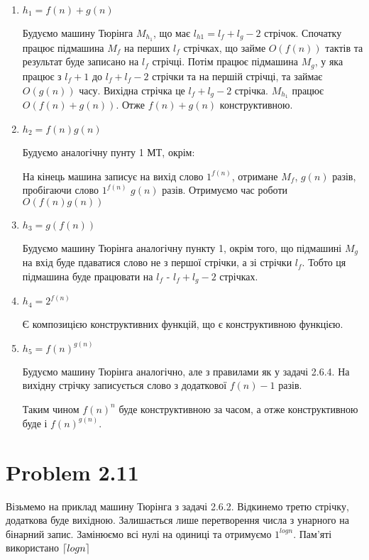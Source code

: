\documentclass[12pt,letterpaper]{article}
\DeclarePairedDelimiter{\ceil}{\lceil}{\rceil}
\begin{document}
\begin{enumerate}
    \item $h_1 = f(n) + g(n)$
        
        Будуємо машину Тюрінга $M_{h_1}$, що має $l_{h1} = l_f + l_g - 2$ стрічок.
        Спочатку працює підмашина $M_f$ на перших $l_f$ стрічках, що займе $O(f(n))$
        тактів та результат буде записано на $l_f$ стрічці. Потім працює підмашина
        $M_g$, у яка працює з $l_f + 1$ до $l_f + l_f - 2$ стрічки та на першій
        стрічці, та займає $O(g(n))$ часу. Вихідна стрічка це $l_f + l_g - 2$
        стрічка. $M_{h_1}$ працює $O(f(n) + g(n))$. Отже $f(n) + g(n)$  конструктивною.

    \item $h_2 = f(n) g(n)$

        Будуємо аналогічну пунту 1 МТ, окрім:

        На кінець машина записує на вихід слово $1^{f(n)}$, отримане $M_f$, $g(n)$
        разів, пробігаючи слово $1^{f(n)}$ $g(n)$ разів. Отримуємо час роботи $O(f(n)g(n))$

    \item $h_3 = g(f(n))$

        Будуємо машину Тюрінга аналогічну пункту 1, окрім того, що підмашині $M_g$ на
        вхід буде пдаватися слово не з першої стрічки, а зі стрічки $l_f$. Тобто ця
        підмашина буде працювати на $l_f$ - $l_f + l_g - 2$ стрічках.

    \item $h_4 = 2^{f(n)}$

        Є композицією конструктивних функцій, що є конструктивною функцією.

    \item $h_5 = f(n)^{g(n)}$

        Будуємо машину Тюрінга аналогічно, але з правилами як у задачі 2.6.4.
        На вихідну стрічку записується слово з додаткової $f(n) - 1$ разів.

        Таким чином $f(n)^n$ буде конструктивною за часом, а отже конструктивною буде і
        $f(n)^{g(n)}$.

        
\end{enumerate}


\section{Problem 2.11}

Візьмемо на приклад машину Тюрінга з задачі  2.6.2. Відкинемо третю стрічку, додаткова
буде вихідною. Залишається лише перетворення числа з унарного на бінарний запис.
Замінюємо всі нулі на одиниці та отримуємо $1^{log n}$. Пам'яті використано $\ceil{log n}$

\end{document}

